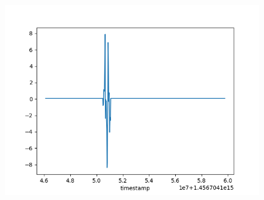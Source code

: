 \documentclass{beamer}
\begin{document}
\begin{frame}
\begin{figure}
    \includegraphics[scale=.15]{point_4}
\end{figure}


\end{frame}
\end{document}
